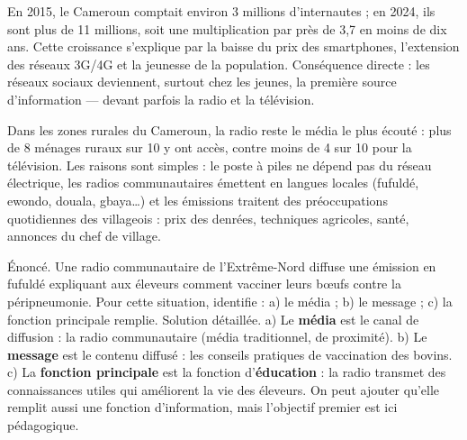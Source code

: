 \documentclass[11pt]{article}
\begin{document}
\begin{exemplebox}
En 2015, le Cameroun comptait environ 3 millions d'internautes ; en 2024, ils sont plus de 11 millions, soit une multiplication par près de 3,7 en moins de dix ans. Cette croissance s'explique par la baisse du prix des smartphones, l'extension des réseaux 3G/4G et la jeunesse de la population. Conséquence directe : les réseaux sociaux deviennent, surtout chez les jeunes, la première source d'information — devant parfois la radio et la télévision.
\end{exemplebox}

\begin{savaistu}
Dans les zones rurales du Cameroun, la radio reste le média le plus écouté : plus de 8 ménages ruraux sur 10 y ont accès, contre moins de 4 sur 10 pour la télévision. Les raisons sont simples : le poste à piles ne dépend pas du réseau électrique, les radios communautaires émettent en langues locales (fufuldé, ewondo, douala, gbaya\ldots) et les émissions traitent des préoccupations quotidiennes des villageois : prix des denrées, techniques agricoles, santé, annonces du chef de village.
\end{savaistu}

\begin{exoresolu}
Énoncé. Une radio communautaire de l'Extrême-Nord diffuse une émission en fufuldé expliquant aux éleveurs comment vacciner leurs bœufs contre la péripneumonie. Pour cette situation, identifie : a) le média ; b) le message ; c) la fonction principale remplie.
\tcblower
Solution détaillée.
a) Le \textbf{média} est le canal de diffusion : la radio communautaire (média traditionnel, de proximité).
b) Le \textbf{message} est le contenu diffusé : les conseils pratiques de vaccination des bovins.
c) La \textbf{fonction principale} est la fonction d'\textbf{éducation} : la radio transmet des connaissances utiles qui améliorent la vie des éleveurs. On peut ajouter qu'elle remplit aussi une fonction d'information, mais l'objectif premier est ici pédagogique.
\end{exoresolu}
\end{document}
